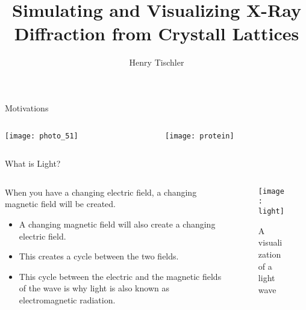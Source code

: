 \documentclass[aspectratio=169]{beamer}
\title {Simulating and Visualizing X-Ray Diffraction from Crystall Lattices}
\author{Henry Tischler}
\institute[Institute of Computing in Research]
\begin{document}
\titlepage

\begin{frame}[t]{Motivations}
	
	\begin{columns}[c]
		\begin{column}{.5\textwidth}
			\texttt{[image: photo\_51]}
		\end{column}
						
		\begin{column}{.5\textwidth}
			\begin{figure}
				\texttt{[image: protein]}
			\end{figure}
		\end{column}
				
	\end{columns}
						
\end{frame}


\begin {frame}{What is Light?}
\begin{columns}
				
	\begin{column}[b]{.5\textwidth}
		When you have a changing electric field, a changing magnetic field will be created.
		\begin{itemize}
			\item A changing magnetic field will also create a changing electric field.
			\item This creates a cycle between the two fields.
			\item This cycle between the electric and the magnetic fields of the wave is why light is also known as electromagnetic radiation.
		\end{itemize}		
	\end{column}
				
	\begin{column}{.5\textwidth}
		\begin{figure}
			\texttt{[image: light]}
			\caption{A visualization of a light wave}
		\end{figure}
	\end{column}
				
\end{columns}
\end{frame}
\end{document}
